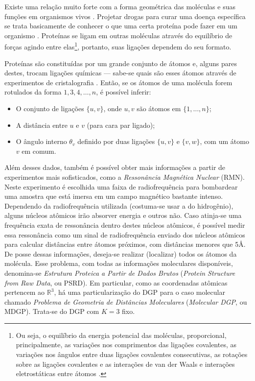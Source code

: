 Existe uma relação muito forte com a forma geométrica das moléculas e suas funções em organismos vivos \cite{bioquimicaLehninger}. Projetar drogas para curar uma doença específica se trata basicamente de conhecer o que uma certa proteína pode fazer em um organismo \cite{libertiEDG}. Proteínas se ligam em outras moléculas através do equilíbrio de forças agindo entre elas\footnote{Ou seja, o equilíbrio da energia potencial das moléculas, proporcional, principalmente, as variações nos comprimentos das ligações covalentes, as variações nos ângulos entre duas ligações covalentes consecutivas, as rotações sobre as ligações covalentes e as interações de van der Waals e interações eletrostáticas entre átomos \cite{carlileTese}.}, portanto, suas ligações dependem do seu formato. 

Proteínas são constituídas por um grande conjunto de átomos e, alguns pares destes, trocam ligações químicas --- sabe-se quais são esses átomos através de experimentos de cristalografia \cite{ramachandran1974MolStructure}. Então, se os átomos de uma molécula forem rotulados da forma $1,3,4,\dots,n$, é possível inferir: 
\begin{itemize}
	\item O conjunto de ligações $\{u,v\}$, onde $u,v$ são átomos em $\{1,\dots,n\}$;
	\item A distância entre $u$ e $v$ (para cara par ligado);
	\item O ângulo interno $\theta_v$ definido por duas ligações $\{u,v\}$ e $\{v,w\}$, com um átomo $v$ em comum.
\end{itemize} 

Além desses dados, também é possível obter mais informações a partir de experimentos mais sofisticados, como a \textit{Ressonância Magnética Nuclear} (RMN). Neste experimento é escolhida uma faixa de radiofrequência para bombardear uma amostra que está imersa em um campo magnético bastante intenso. Dependendo da radiofrequência utilizada (costuma-se usar a do hidrogênio), alguns núcleos atômicos irão absorver energia e outros não. Caso atinja-se uma frequência exata de ressonância dentro destes núcleos atômicos, é possível medir essa ressonância como um sinal de radiofrequência enviado dos núcleos atômicos para calcular distâncias entre átomos próximos, com distâncias menores que 5\AA.
\\

De posse dessas informações, deseja-se realizar (localizar) todos os átomos da molécula. Esse problema, com todas as informações moleculares disponíveis, denomina-se \textit{Estrutura Proteica a Partir de Dados Brutos} (\textit{Protein Structure from Raw Data}, ou PSRD). 
Em particular, como as coordenadas atômicas pertencem ao $\mathbb{R}^3$, há uma particularização do DGP para o caso molecular chamado \textit{Problema de Geometria de Distâncias Moleculares} (\textit{Molecular DGP}, ou MDGP). Trata-se do DGP com $K = 3$ fixo.


